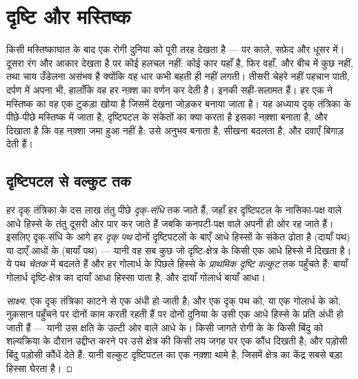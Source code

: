 \chapter{दृष्टि और मस्तिष्क}\label{ch:g11:vision-and-brain}

किसी मस्तिष्काघात के बाद एक रोगी दुनिया को पूरी तरह देखता है --- पर काले,
सफ़ेद और धूसर में। दूसरा रंग और आकार देखता है पर कोई हलचल नहीं: कोई कार
यहाँ है, फिर वहाँ, और बीच में कुछ नहीं, तथा चाय उँडेलना असंभव है क्योंकि वह
धार कभी बहती ही नहीं लगती। तीसरी चेहरे नहीं पहचान पाती, दर्पण में अपना भी,
हालाँकि वह हर नक़्श का वर्णन कर देती है। इनकी  सही-सलामत हैं। हर एक ने
मस्तिष्क का वह एक टुकड़ा खोया है जिसमें देखना जोड़कर बनाया जाता है। यह
अध्याय दृक् तंत्रिका के पीछे-पीछे मस्तिष्क में जाता है, 
दृष्टिपटल के संकेतों का क्या करता है इसका नक़्शा बनाता है, और दिखाता है कि
वह नक़्शा जमा हुआ नहीं है: उसे अनुभव बनाता है, सीखना बदलता है, और दवाएँ
बिगाड़ देती हैं।

\section{दृष्टिपटल से वल्कुट तक}

\begin{proposition}[दृष्टि का रास्ता]\label{prop:g11:vision-and-brain:pathway}
हर दृक् तंत्रिका के दस लाख तंतु पीछे \emph{दृक्-संधि} तक जाते हैं, जहाँ हर
दृष्टिपटल के नासिका-पक्ष वाले आधे हिस्से के तंतु दूसरी ओर पार कर जाते हैं
जबकि कनपटी-पक्ष वाले अपनी ही ओर रह जाते हैं। इसलिए दृक्-संधि के आगे हर
\emph{दृक् पथ} दोनों दृष्टिपटलों के बाएँ आधे हिस्सों के संकेत ढोता है (दायाँ
पथ) या दाएँ आधों के (बायाँ पथ) --- यानी वह सब कुछ जो दृष्टि-क्षेत्र के किसी
एक आधे हिस्से में दिखता है। ये पथ \emph{चेतक} में बदलते हैं और हर गोलार्ध
के पिछले हिस्से के \emph{प्राथमिक दृष्टि वल्कुट} तक
पहुँचते हैं: बायाँ गोलार्ध दृष्टि-क्षेत्र का दायाँ आधा हिस्सा पाता है, और
दायाँ गोलार्ध बायाँ आधा।
\end{proposition}
\begin{proof}[साक्ष्य]
एक दृक् तंत्रिका काटने से एक  अंधी हो जाती है; और एक दृक् पथ को, या एक
गोलार्ध के  को, नुक़सान पहुँचने पर दोनों  काम करती रहती
हैं पर दोनों दुनिया के उसी एक आधे हिस्से के प्रति अंधी हो जाती हैं ---
यानी उस क्षति के उल्टी ओर वाले आधे के। किसी जागते रोगी के  के
किसी बिंदु को शल्यक्रिया के दौरान उद्दीप्त करने पर उसे क्षेत्र की किसी तय
जगह पर एक कौंध दिखती है; और पड़ोसी बिंदु पड़ोसी कौंधें देते हैं: यानी वल्कुट
दृष्टिपटल का एक नक़्शा थामे है, जिसमें क्षेत्र का केंद्र सबसे बड़ा हिस्सा
घेरता है।
\end{proof}

